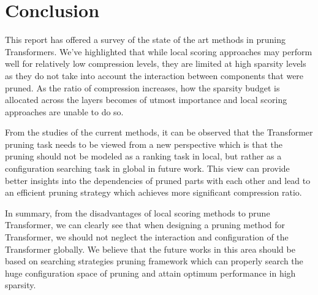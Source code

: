 \chapter{Conclusion}
\label{chap:conclusion}

This report has offered a survey of the state of the art methods in pruning Transformers. We've highlighted that while local scoring approaches may perform well for relatively low compression levels, they are limited at high sparsity levels as they do not take into account the interaction between components that were pruned. As the ratio of compression increases, how the sparsity budget is allocated across the layers becomes of utmost importance and local scoring approaches are unable to do so.

From the studies of the current methods, it can be observed that the Transformer pruning task needs to be viewed from a new perspective which is that the pruning should not be modeled as a ranking task in local, but rather as a configuration searching task in global in future work. This view can provide better insights into the dependencies of pruned parts with each other and lead to an efficient pruning strategy which achieves more significant compression ratio.

In summary, from the disadvantages of local scoring methods to prune Transformer, we can clearly see that when designing a pruning method for Transformer, we should not neglect the interaction and configuration of the Transformer globally. We believe that the future works in this area should be based on searching strategies pruning framework which can properly search the huge configuration space of pruning and attain optimum performance in high sparsity.